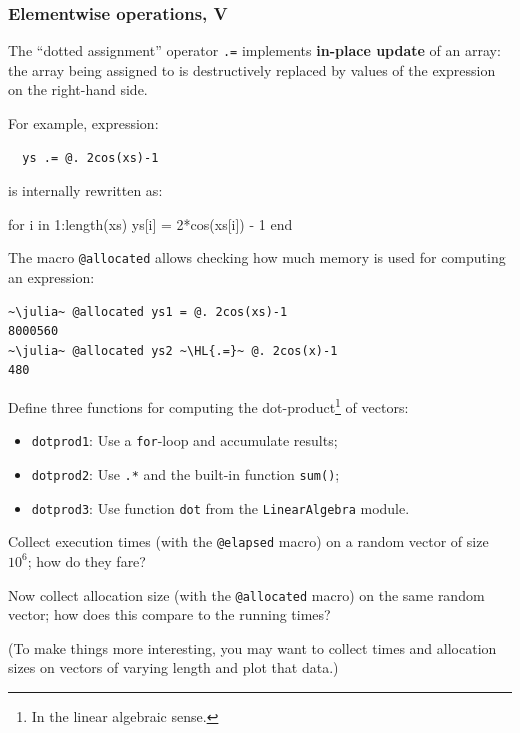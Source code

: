 \documentclass[english,serif,mathserif,xcolor=pdftex,dvipsnames,table]{beamer}
\begin{document}
\begin{frame}
  \frametitle{Elementwise operations, V}
  \smaller
  The ``dotted assignment'' operator \texttt{.=} implements \textbf{in-place
    update} of an array: the array being assigned to is destructively
  replaced by values of the expression on the right-hand side.

  \+ For example, expression:
\begin{lstlisting}
  ys .= @. 2cos(xs)-1
\end{lstlisting}
  is internally rewritten as:
\begin{jl}
  for i in 1:length(xs)
    ys[i] = 2*cos(xs[i]) - 1
  end
\end{jl}

  \+ The macro \texttt{@allocated} allows checking how much memory is
  used for computing an expression:
\begin{lstlisting}
~\julia~ @allocated ys1 = @. 2cos(xs)-1
8000560
~\julia~ @allocated ys2 ~\HL{.=}~ @. 2cos(x)-1
480
\end{lstlisting}

\end{frame}


\begin{frame}
  \smaller
  \begin{exercise*}[4.D*]
    Define three functions for computing the dot-product\footnote{In the
    linear algebraic sense.} of vectors:
  \begin{itemize}
  \item \texttt{dotprod1}: Use a \texttt{for}-loop and accumulate results;
  \item \texttt{dotprod2}: Use \texttt{.*} and the built-in function \texttt{sum()};
  \item \texttt{dotprod3}: Use function \texttt{dot} from the
    \texttt{LinearAlgebra} module.
  \end{itemize}

  \+
  Collect execution times (with the \texttt{@elapsed} macro) on a
  random vector of size $10^6$; how do they fare?

  \+
  Now collect allocation size (with the \texttt{@allocated} macro) on
  the same random vector; how does this compare to the running times?

  \+
  (To make things more interesting, you may want to collect times and
  allocation sizes on vectors of varying length and plot that data.)
  \end{exercise*}
\end{frame}
\end{document}
